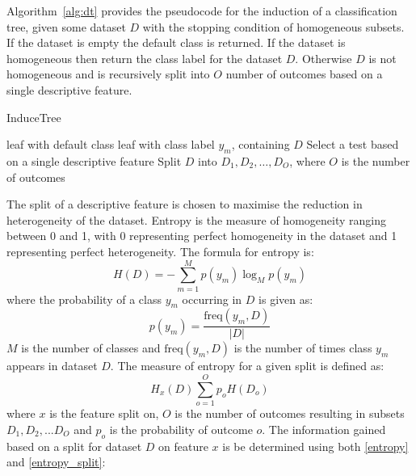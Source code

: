 \documentclass[conference]{IEEEtran}
\begin{document}
	Algorithm~\ref{alg:dt} provides the pseudocode for the induction of a classification tree, given some dataset $D$ with the stopping condition of homogeneous subsets. If the dataset is empty the default class is returned. If the dataset is homogeneous then return the class label for the dataset $D$. Otherwise $D$ is not homogeneous and is recursively split into $O$ number of outcomes based on a single descriptive feature. 
	\begin{algorithm}
		\caption{InduceTree}
		\begin{algorithmic}[1]
			 
			\State \Return leaf with default class
			\EndIf
			 
			\State \Return leaf with class label $y_m$, containing $D$
			\EndIf
			\State Select a test based on a single descriptive feature
			\State Split $D$ into $D_1, D_2, \ldots, D_O$, where $O$ is the number of outcomes
			\State {}
			\EndFor
			\EndFunction
		\end{algorithmic}
		\label{alg:dt}
	\end{algorithm}
	The split of a descriptive feature is chosen to maximise the reduction in heterogeneity of the dataset. Entropy is the measure of homogeneity ranging between 0 and 1, with 0 representing perfect homogeneity in the dataset and 1 representing perfect heterogeneity. The formula for entropy is:
	\begin{equation}
		H(D)=-\sum^M_{m=1}p(y_m)\log_M p(y_m) \label{entropy}
	\end{equation}
	where the probability of a class $y_m$ occurring in $D$ is given as:
	\begin{equation}
		p(y_m)= \frac{\text{freq}(y_m, D)}{|D|}\label{classprob}
	\end{equation}
	$M$ is the number of classes and $\text{freq}(y_m, D)$ is the number of times class $y_m$ appears in dataset $D$.
	The measure of entropy for a given split is defined as:
	\begin{equation}
		H_x(D)  \sum^O_{o=1} p_o H(D_o) \label{entropy_split}
	\end{equation}
	where $x$ is the feature split on, $O$ is the number of outcomes resulting in subsets $D_1, D_2, ... D_O$ and $p_o$ is the probability of outcome $o$.
	The information gained based on a split for dataset $D$ on feature $x$ is be determined using both \eqref{entropy} and \eqref{entropy_split}:
\end{document}
